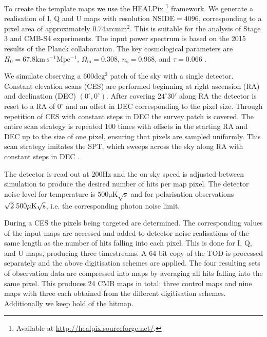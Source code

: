 \documentclass[apj]{emulateapj}
\begin{document}

To create the template maps we use the HEALPix \citep{healpix}\footnote{Available at \url{http://healpix.sourceforge.net/}.} framework. We generate a realisation of I, Q and U maps with resolution $\mathrm{NSIDE} = 4096$, corresponding to a pixel area of approximately $0.74\mathrm{arcmin^2}$. This is suitable for the analysis of Stage 3 and CMB-S4 experiments. The input power spectrum is based on the 2015 results of the Planck collaboration. The key cosmological parameters are $H_0 = 67.8 \mathrm{km \> s^{-1} Mpc^{-1}}$, $\Omega_{\mathrm{m}} = 0.308 $, $n_{\mathrm{s}} = 0.968$, and $\tau = 0.066$ \citep{planck2016}.


We simulate observing a $600 \mathrm{deg^2}$ patch of the sky with a single detector. Constant elevation scans (CES) are performed beginning at right ascension (RA) and declination (DEC) $(0^\circ, 0^\circ)$. After covering $24^\circ30'$ along RA the detector is reset to a RA of $0^\circ$ and an offset in DEC corresponding to the pixel size. Through repetition of CES with constant steps in DEC the survey patch is covered. The entire scan strategy is repeated $100$ times with offsets in the starting RA and DEC up to the size of one pixel, ensuring that pixels are sampled uniformly. This scan strategy imitates the SPT, which sweeps across the sky along RA with constant steps in DEC \citep{chown2018}.

The detector is read out at $200\mathrm{Hz}$ and the on sky speed is adjusted between simulation to produce the desired number of hits per map pixel. The detector noise level for temperature is $500 \mathrm{\mu K \sqrt{s}}$ and for polarisation observations $\sqrt{2} \hspace{0.7ex} 500 \mathrm{\mu K \sqrt{s}}$, i.e. the corresponding photon noise limit.

During a CES the pixels being targeted are determined. The corresponding values of the input maps are accessed and added to detector noise realisations of the same length as the number of hits falling into each pixel. This is done for I, Q, and U maps, producing three timestreams. A 64 bit copy of the TOD is processed separately and the above digitisation schemes are applied. The four resulting sets of observation data are compressed into maps by averaging all hits falling into the same pixel. This produces 24 CMB maps in total: three control maps and nine maps with three each obtained from the different digitisation schemes. Additionally we keep hold of the hitmap.
\end{document}
